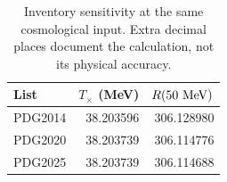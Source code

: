 \begin{table}[t]\centering\small
\caption{Inventory sensitivity at the same cosmological input. Extra decimal places document the calculation, not its physical accuracy.}
\label{tab:crosscatalogs}
\begin{tabular}{lrr}\toprule
List & $T_\times$ (MeV) & $R(50\ {\rm MeV})$\\\midrule
PDG2014 & 38.203596 & 306.128980\\
PDG2020 & 38.203739 & 306.114776\\
PDG2025 & 38.203739 & 306.114688\\
\bottomrule\end{tabular}
\end{table}

